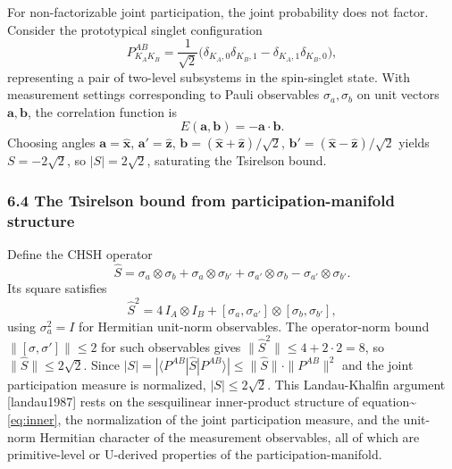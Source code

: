 \documentclass[
  11pt,
]{article}
\begin{document}
For non-factorizable joint participation, the joint probability does not
factor. Consider the prototypical singlet configuration \begin{equation}
  P^{AB}_{K_A K_B} = \frac{1}{\sqrt{2}} \bigl( \delta_{K_A,0}\delta_{K_B,1} - \delta_{K_A,1}\delta_{K_B,0} \bigr),
\end{equation} representing a pair of two-level subsystems in the
spin-singlet state. With measurement settings corresponding to Pauli
observables \(\sigma_a, \sigma_b\) on unit vectors
\(\mathbf{a}, \mathbf{b}\), the correlation function is \begin{equation}
  E(\mathbf{a}, \mathbf{b}) = -\mathbf{a} \cdot \mathbf{b}.
\end{equation} Choosing angles \(\mathbf{a} = \hat{\mathbf{x}}\),
\(\mathbf{a}' = \hat{\mathbf{z}}\),
\(\mathbf{b} = (\hat{\mathbf{x}} + \hat{\mathbf{z}})/\sqrt{2}\),
\(\mathbf{b}' = (\hat{\mathbf{x}} - \hat{\mathbf{z}})/\sqrt{2}\) yields
\(S = -2\sqrt{2}\), so \(|S| = 2\sqrt{2}\), saturating the Tsirelson
bound.

\subsubsection{6.4 The Tsirelson bound from participation-manifold
structure}\label{the-tsirelson-bound-from-participation-manifold-structure}

Define the CHSH operator \begin{equation}
  \hat{S} = \sigma_a \otimes \sigma_b + \sigma_a \otimes \sigma_{b'} + \sigma_{a'} \otimes \sigma_b - \sigma_{a'} \otimes \sigma_{b'}.
\end{equation} Its square satisfies \begin{equation}
  \hat{S}^2 = 4 \, I_A \otimes I_B + [\sigma_a, \sigma_{a'}] \otimes [\sigma_b, \sigma_{b'}],
\end{equation} using \(\sigma_a^2 = I\) for Hermitian unit-norm
observables. The operator-norm bound \(\|[\sigma, \sigma']\| \leq 2\)
for such observables gives \(\|\hat{S}^2\| \leq 4 + 2 \cdot 2 = 8\), so
\(\|\hat{S}\| \leq 2\sqrt{2}\). Since
\(|S| = |\langle P^{AB} | \hat{S} | P^{AB} \rangle| \leq \|\hat{S}\| \cdot \|P^{AB}\|^2\)
and the joint participation measure is normalized,
\(|S| \leq 2\sqrt{2}\). This Landau-Khalfin argument {[}landau1987{]}
rests on the sesquilinear inner-product structure of
equation\textasciitilde{}\eqref{eq:inner}, the normalization of the
joint participation measure, and the unit-norm Hermitian character of
the measurement observables, all of which are primitive-level or
U-derived properties of the participation-manifold.
\end{document}
